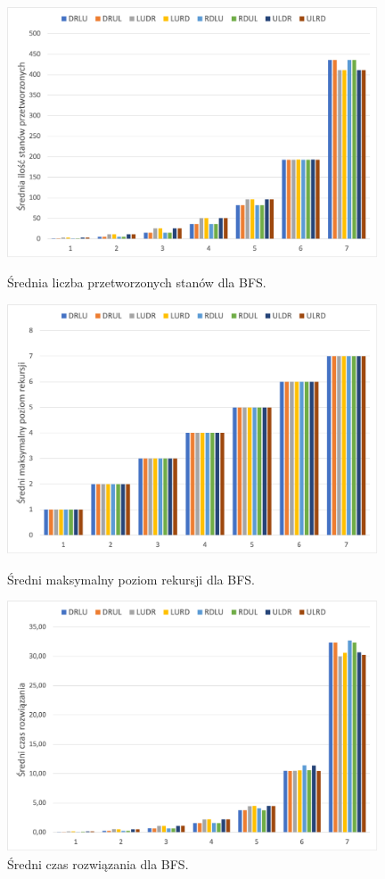 \documentclass{classrep}
\begin{document}
\begin{figure}
	\includegraphics[width=11cm]{BFS/BFS_przetworzone}
	\centering
	\captionsetup{name=Wykres}
	\caption{Średnia liczba przetworzonych stanów dla BFS.}
		
	\includegraphics[width=11cm]{BFS/BFS_poziom_rekursji}
	\centering
	\captionsetup{name=Wykres}
	\caption{Średni maksymalny poziom rekursji dla BFS.}
		
	\includegraphics[width=11cm]{BFS/BFS_czas}
	\centering
	\captionsetup{name=Wykres}
	\caption{Średni czas rozwiązania dla BFS.}
\end{figure}
\end{document}
